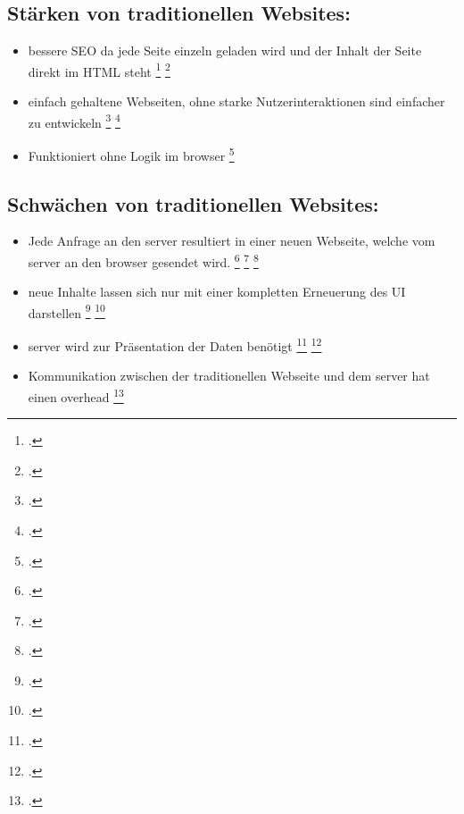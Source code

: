 \subsection{Stärken von traditionellen Websites:}

\begin{itemize}
    \item bessere \ac{SEO} da jede Seite einzeln geladen wird und der Inhalt der Seite direkt im \ac{HTML} steht \footcite[Vgl. ][Seite 7]{Smith2022} \footcite[Vgl.][Seite 143]{Irudayaraj2019}
    \item einfach gehaltene Webseiten, ohne starke Nutzerinteraktionen sind einfacher zu entwickeln \footcite[Vgl. ][Seite 7]{Smith2022} \footcite[Vgl.][Seite 143]{Irudayaraj2019}
    \item Funktioniert ohne Logik im \gls{browser} \footcite[Vgl. ][Seite 7]{Smith2022}
\end{itemize}

\subsection{Schwächen von traditionellen Websites:}

\begin{itemize}
    \item Jede Anfrage an den \gls{server} resultiert in einer neuen Webseite, welche vom \gls{server} an den \gls{browser} gesendet wird. \footcite[Vgl. ][Seite 5]{Flanagan2011} \footcite[Vgl. ][Seite 33]{Robbins2018} \footcite[Vgl.][Seite 5]{Solovei2018}
    \item neue Inhalte lassen sich nur mit einer kompletten Erneuerung des \ac{UI} darstellen \footcite[Vgl. ][Seite 6]{Flanagan2011} \footcite[Vgl. ][Seite 33]{Robbins2018}
    \item \gls{server} wird zur Präsentation der Daten benötigt \footcite[Vgl. ][Seite 7]{Flanagan2011} \footcite[Vgl. ][Seite 33]{Robbins2018}
    \item Kommunikation zwischen der traditionellen Webseite und dem \gls{server} hat einen \gls{overhead} \footcite[Vgl. ][Seite 7]{Flanagan2011}
\end{itemize}

